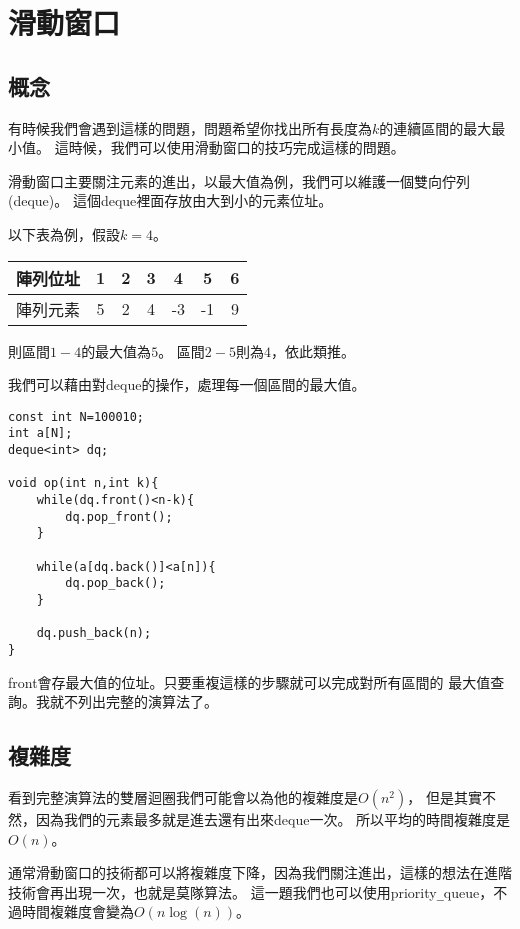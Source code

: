 \section{滑動窗口}
    \subsection{概念}
    有時候我們會遇到這樣的問題，問題希望你找出所有長度為$k$的連續區間的最大最小值。
    這時候，我們可以使用滑動窗口的技巧完成這樣的問題。
    
    滑動窗口主要關注元素的進出，以最大值為例，我們可以維護一個雙向佇列(deque)。
    這個deque裡面存放由大到小的元素位址。

    以下表為例，假設$k=4$。

    \begin{center}
    \begin{tabular}[ht]{c|c|c|c|c|c|c}
        陣列位址 & 1 & 2 & 3 & 4 & 5 & 6 \\
        \hline
        陣列元素 & 5 & 2 & 4 & -3 & -1 & 9
    \end{tabular}
    \end{center}

    則區間$1-4$的最大值為$5$。
    區間$2-5$則為$4$，依此類推。

    我們可以藉由對deque的操作，處理每一個區間的最大值。

\begin{lstlisting}[caption=維護最大值deque]
const int N=100010;
int a[N];
deque<int> dq;

void op(int n,int k){
    while(dq.front()<n-k){
        dq.pop_front();
    }

    while(a[dq.back()]<a[n]){
        dq.pop_back();
    }

    dq.push_back(n);
}
\end{lstlisting}

    front會存最大值的位址。只要重複這樣的步驟就可以完成對所有區間的
    最大值查詢。我就不列出完整的演算法了。

    \subsection{複雜度}
    看到完整演算法的雙層迴圈我們可能會以為他的複雜度是$O(n^2)$，
    但是其實不然，因為我們的元素最多就是進去還有出來deque一次。
    所以平均的時間複雜度是$O(n)$。

    通常滑動窗口的技術都可以將複雜度下降，因為我們關注進出，這樣的想法在進階技術會再出現一次，也就是莫隊算法。
    這一題我們也可以使用priority\verb|_|queue，不過時間複雜度會變為$O(n\log{(n)})$。

